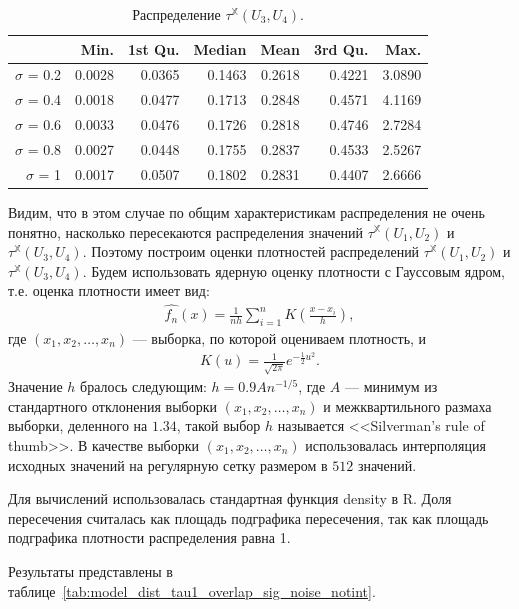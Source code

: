 \documentclass[specialist,
               substylefile = spbu.rtx,
               subf,href,colorlinks=true, 12pt]{disser}
\begin{document}
\begin{table}[hhh!]
\caption{Распределение $\tau^{\mathbb{X}}(U_3, U_4)$.}
\centering
\begin{tabular}{rrrrrrr}
  \hline
 & Min. & 1st Qu. & Median & Mean & 3rd Qu. & Max. \\
  \hline
$\sigma$ = 0.2 & 0.0028 & 0.0365 & 0.1463 & 0.2618 & 0.4221 & 3.0890 \\ 
  $\sigma$ = 0.4 & 0.0018 & 0.0477 & 0.1713 & 0.2848 & 0.4571 & 4.1169 \\ 
  $\sigma$ = 0.6 & 0.0033 & 0.0476 & 0.1726 & 0.2818 & 0.4746 & 2.7284 \\ 
  $\sigma$ = 0.8 & 0.0027 & 0.0448 & 0.1755 & 0.2837 & 0.4533 & 2.5267 \\ 
  $\sigma$ = 1 & 0.0017 & 0.0507 & 0.1802 & 0.2831 & 0.4407 & 2.6666 \\ 
   \hline
\end{tabular}
\label{tab:model_dist_tau1_sig_noise_notint2}
\end{table}

Видим, что в этом случае по общим характеристикам распределения не очень понятно, насколько пересекаются распределения значений $\tau^{\mathbb{X}}(U_1, U_2)$ и  $\tau^{\mathbb{X}}(U_3, U_4)$.
Поэтому построим оценки плотностей распределений $\tau^{\mathbb{X}}(U_1, U_2)$ и  $\tau^{\mathbb{X}}(U_3, U_4)$.
Будем использовать ядерную оценку плотности с Гауссовым ядром, т.е. оценка плотности имеет вид:
\begin{gather*}
\hat{f_n}(x) = \frac{1}{nh} \sum_{i = 1}^{n}{K\left(\frac{x - x_i}{h}\right)},
\end{gather*}
где $(x_1,x_2,\ldots,x_n)$ --- выборка, по которой оцениваем плотность, и
\begin{gather*}
K(u) = \frac{1}{\sqrt{2\pi}}{e^{-\frac{1}{2}u^2}}.
\end{gather*}
Значение $h$ бралось следующим: $h = 0.9 A n^{-1/5}$, где $A$ --- минимум из стандартного отклонения выборки $(x_1,x_2,\ldots,x_n)$ и межквартильного размаха выборки, деленного на $1.34$, такой выбор $h$ называется <<Silverman’s rule of thumb>>. В качестве выборки $(x_1,x_2,\ldots,x_n)$ использовалась интерполяция исходных значений на регулярную сетку размером в $512$ значений.

Для вычислений использовалась стандартная функция density в R.
Доля пересечения считалась как площадь подграфика пересечения, так как площадь подграфика плотности распределения равна 1.

Результаты представлены в таблице~\ref{tab:model_dist_tau1_overlap_sig_noise_notint}.
\end{document}
